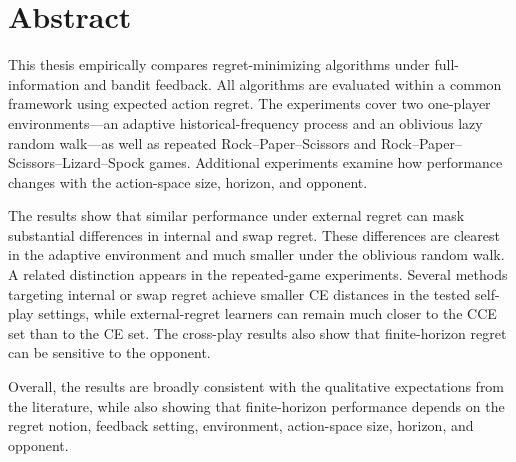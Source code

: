 \chapter*{Abstract}

This thesis empirically compares regret-minimizing algorithms under full-information and bandit feedback. All algorithms are evaluated within a common framework using expected action regret. The experiments cover two one-player environments---an adaptive historical-frequency process and an oblivious lazy random walk---as well as repeated Rock--Paper--Scissors and Rock--Paper--Scissors--Lizard--Spock games. Additional experiments examine how performance changes with the action-space size, horizon, and opponent.

The results show that similar performance under external regret can mask substantial differences in internal and swap regret. These differences are clearest in the adaptive environment and much smaller under the oblivious random walk. A related distinction appears in the repeated-game experiments. Several methods targeting internal or swap regret achieve smaller CE distances in the tested self-play settings, while external-regret learners can remain much closer to the CCE set than to the CE set. The cross-play results also show that finite-horizon regret can be sensitive to the opponent.

Overall, the results are broadly consistent with the qualitative expectations from the literature, while also showing that finite-horizon performance depends on the regret notion, feedback setting, environment, action-space size, horizon, and opponent.
